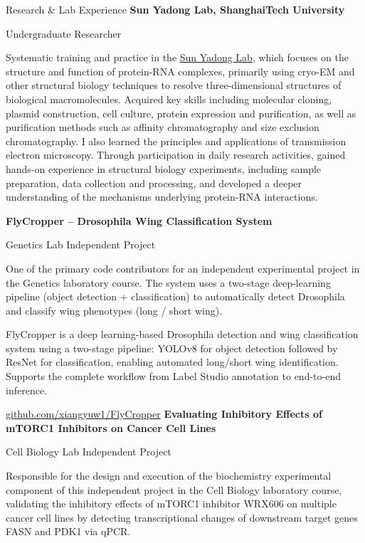 \begin{rubric}{Research \& Lab Experience}
\entry*[2024 -- Present]%
	\textbf{Sun Yadong Lab, ShanghaiTech University}\par
	Undergraduate Researcher\par
	Systematic training and practice in the \href{https://slst.shanghaitech.edu.cn/syd/main.htm}{Sun Yadong Lab}, which focuses on the structure and function of protein-RNA complexes, primarily using cryo-EM and other structural biology techniques to resolve three-dimensional structures of biological macromolecules. Acquired key skills including molecular cloning, plasmid construction, cell culture, protein expression and purification, as well as purification methods such as affinity chromatography and size exclusion chromatography. I also learned the principles and applications of transmission electron microscopy. Through participation in daily research activities, gained hands-on experience in structural biology experiments, including sample preparation, data collection and processing, and developed a deeper understanding of the mechanisms underlying protein-RNA interactions.\par
%
\entry*[Fall 2025]%
	\textbf{FlyCropper -- Drosophila Wing Classification System}\par
	Genetics Lab Independent Project\par
	One of the primary code contributors for an independent experimental project in the Genetics laboratory course. The system uses a two-stage deep-learning pipeline (object detection + classification) to automatically detect Drosophila and classify wing phenotypes (long / short wing).\par
	FlyCropper is a deep learning-based Drosophila detection and wing classification system using a two-stage pipeline: YOLOv8 for object detection followed by ResNet for classification, enabling automated long/short wing identification. Supports the complete workflow from Label Studio annotation to end-to-end inference.\par
	\href{https://github.com/xiangyuw1/FlyCropper}{github.com/xiangyuw1/FlyCropper}
%
\entry*[Spring 2025]%
	\textbf{Evaluating Inhibitory Effects of mTORC1 Inhibitors on Cancer Cell Lines}\par
	Cell Biology Lab Independent Project\par
	Responsible for the design and execution of the biochemistry experimental component of this independent project in the Cell Biology laboratory course, validating the inhibitory effects of mTORC1 inhibitor WRX606 on multiple cancer cell lines by detecting transcriptional changes of downstream target genes FASN and PDK1 via qPCR.

\end{rubric}
